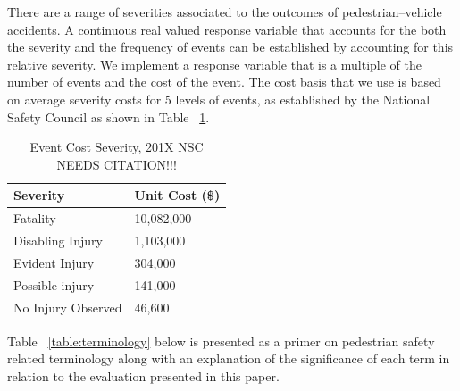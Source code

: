 \documentclass{llncs}
\begin{document}
There are a range of severities associated to the outcomes of pedestrian--vehicle accidents. A continuous real valued response variable that accounts for the both the severity and the frequency of events can be established by accounting for this relative severity. We implement a response variable that is a multiple of the number of events and the cost of the event. The cost basis that we use is based on average severity costs for 5 levels of events, as established by the National Safety Council \cite{nsc2012estimating} as shown in Table ~\ref{table:eventseverity}.
%
\FloatBarrier
\begin{table}[!h]
\begin{center}
\caption{Event Cost Severity, 201X NSC NEEDS CITATION!!!}
\label{table:eventseverity}
\begin{tabular}{p{50mm}  p{50mm}}
\hline
\rule{0pt}{12pt}
Severity & Unit Cost (\$)\\[2pt]
\hline
Fatality 			&10,082,000\\
Disabling Injury 		&1,103,000\\
Evident Injury 		&304,000\\
Possible injury 		&141,000\\
No Injury Observed		&46,600\\[2pt]
\hline
\end{tabular}
\end{center}
\end{table}
\FloatBarrier
%
Table ~\ref{table:terminology} below is presented as a primer on pedestrian safety related terminology along with an explanation of the significance of each term in relation to the evaluation presented in this paper.
%
\FloatBarrier
\end{document}
